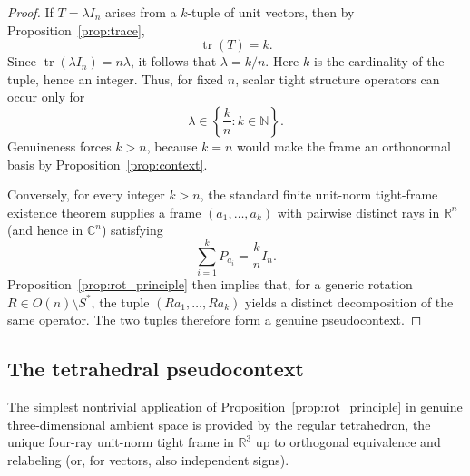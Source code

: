 \documentclass[
  twocolumn,
  aps,
  pra,
  floatfix,
  amsmath,amssymb,
  longbibliography
]{revtex4-2}
\theoremstyle{definition}
\theoremstyle{remark}
\begin{document}
\begin{proof}
If $T = \lambda I_n$ arises from a $k$-tuple of unit vectors,
then by Proposition~\ref{prop:trace},
\[
\operatorname{tr}(T) = k.
\]
Since $\operatorname{tr}(\lambda I_n) = n\lambda$, it follows that
$\lambda = k/n$.
Here \(k\) is the cardinality of the tuple, hence an integer. Thus, for fixed \(n\), scalar tight structure operators can occur only for
\[
\lambda\in\left\{\frac{k}{n}:k\in\mathbb N\right\}.
\]
Genuineness forces \(k>n\), because \(k=n\) would make the frame an orthonormal basis by Proposition~\ref{prop:context}.

Conversely, for every integer $k>n$, the standard finite unit-norm
tight-frame existence theorem supplies a frame
$(a_1,\dots,a_k)$ with pairwise distinct rays in $\mathbb{R}^n$
(and hence in $\mathbb{C}^n$) satisfying
\[
\sum_{i=1}^k P_{a_i} = \frac{k}{n} I_n.
\]
Proposition~\ref{prop:rot_principle} then implies that, for a generic
rotation $R \in O(n) \setminus S^{*}$, the tuple
$(Ra_1,\dots,Ra_k)$ yields a distinct decomposition of the same
operator. The two tuples therefore form a genuine pseudocontext.
\end{proof}

\subsection{The tetrahedral pseudocontext}
\label{sec:tetrahedron}

The simplest nontrivial application of
Proposition~\ref{prop:rot_principle} in genuine three-dimensional
ambient space is provided by the regular tetrahedron, the unique
four-ray unit-norm tight frame in $\mathbb{R}^3$ up to orthogonal
equivalence and relabeling (or, for vectors, also independent signs).
\end{document}
